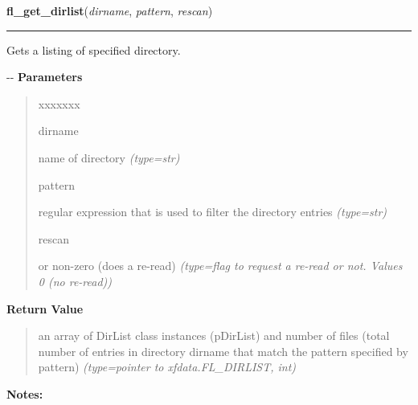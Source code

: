     \vspace{0.5ex}

\hspace{.8\funcindent}\begin{boxedminipage}{\funcwidth}

    \raggedright \textbf{fl\_get\_dirlist}(\textit{dirname}, \textit{pattern}, \textit{rescan})

    \vspace{-1.5ex}

    \rule{\textwidth}{0.5\fboxrule}
\setlength{\parskip}{2ex}

Gets a listing of specified directory.

-{}-
\setlength{\parskip}{1ex}
      \textbf{Parameters}
      \vspace{-1ex}

      \begin{quote}
        \begin{Ventry}{xxxxxxx}

          \item[dirname]


name of directory
            {\it (type=str)}

          \item[pattern]


regular expression that is used to filter the directory entries
            {\it (type=str)}

          \item[rescan]


or non-zero (does a re-read)
            {\it (type=flag to request a re-read or not. Values 0 (no re-read))}

        \end{Ventry}

      \end{quote}

      \textbf{Return Value}
    \vspace{-1ex}

      \begin{quote}

an array of DirList class instances (pDirList) and number of
files (total number of entries in directory dirname that match the
pattern specified by pattern)
      {\it (type=pointer to xfdata.FL\_DIRLIST, int)}

      \end{quote}

\textbf{Notes:}
\begin{quote}
  \begin{itemize}


\end{itemize}
\end{quote}
\end{boxedminipage}
